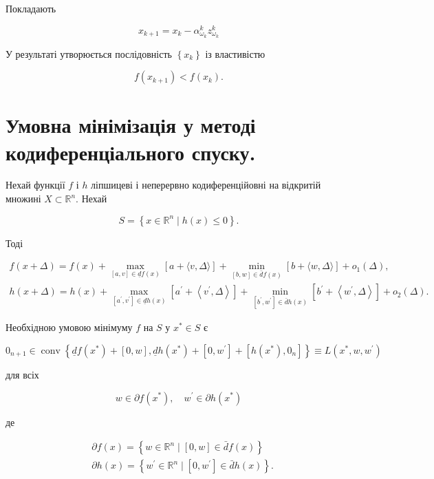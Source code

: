 \documentclass[12pt,a4paper]{extarticle}
\numberwithin{section}{part}
\begin{document}
Покладають

$$
x_{k+1}=x_{k}-\alpha_{\omega_{k}}^{k} z_{\omega_{k}}^{k}
$$

У результаті утворюється послідовність $\left\{x_{k}\right\}$ із властивістю

$$
f\left(x_{k+1}\right)<f\left(x_{k}\right) .
$$

\section{Умовна мінімізація у методі кодиференціального спуску.}
Нехай функції $f$ і $h$ ліпшицеві і неперервно кодиференційовні на відкритій множині $X \subset \mathbb{R}^{n}$. Нехай

$$
S=\left\{x \in \mathbb{R}^{n} \mid h(x) \leq 0\right\} .
$$

Тоді

$$
\begin{gathered}
f(x+\Delta)=f(x)+\max _{[a, v] \in \underline{d} f(x)}[a+\langle v, \Delta\rangle]+\min _{[b, w] \in \bar{d} f(x)}[b+\langle w, \Delta\rangle]+o_{1}(\Delta), \\
h(x+\Delta)=h(x)+\max _{\left[a^{\prime}, v^{\prime}\right] \in \underline{d} h(x)}\left[a^{\prime}+\left\langle v^{\prime}, \Delta\right\rangle\right]+\min _{\left[b^{\prime}, w^{\prime}\right] \in \bar{d} h(x)}\left[b^{\prime}+\left\langle w^{\prime}, \Delta\right\rangle\right]+o_{2}(\Delta) .
\end{gathered}
$$

Необхідною умовою мінімуму $f$ на $S$ у $x^{*} \in S$ є

$$
0_{n+1} \in \operatorname{conv}\left\{\underline{d} f\left(x^{*}\right)+[0, w], \underline{d} h\left(x^{*}\right)+\left[0, w^{\prime}\right]+\left[h\left(x^{*}\right), 0_{n}\right]\right\} \equiv L\left(x^{*}, w, w^{\prime}\right)
$$

для всіх

$$
w \in \partial f\left(x^{*}\right), \quad w^{\prime} \in \partial h\left(x^{*}\right)
$$

де

$$
\begin{aligned}
& \partial f(x)=\left\{w \in \mathbb{R}^{n} \mid[0, w] \in \bar{d} f(x)\right\} \\
& \partial h(x)=\left\{w^{\prime} \in \mathbb{R}^{n} \mid\left[0, w^{\prime}\right] \in \bar{d} h(x)\right\} .
\end{aligned}
$$

\end{document}
